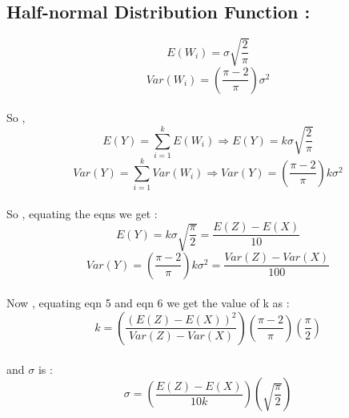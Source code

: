 \documentclass{article}
\begin{document}
    \subsection{Half-normal Distribution Function :}
    \vspace{5pt}
    \setcounter{equation}{0}
    \begin{equation}
        E(W_i) = \sigma \sqrt{\frac{2}{\pi}} 
    \end{equation}
    \begin{equation}
        Var(W_i) = \left(\frac{\pi-2}{\pi}\right)\sigma^2 
    \end{equation}
    \\So ,
    \begin{equation}
        E(Y) = \sum_{i = 1}^{k} E(W_i)
        \Rightarrow E(Y) = k\sigma \sqrt{\frac{2}{\pi}} 
    \end{equation}
    \begin{equation}
        Var(Y) = \sum_{i = 1}^{k} Var(W_i)
        \Rightarrow Var(Y) = \left(\frac{\pi-2}{\pi}\right)k\sigma^2
    \end{equation}
    \vspace{5pt}
    \\So , equating the eqns we get : 
    \begin{equation}
        E(Y) = k\sigma\sqrt{\frac{\pi}{2}} = \frac{E(Z) - E(X)}{10}
    \end{equation}
    \begin{equation}
        Var(Y) = \left(\frac{\pi-2}{\pi}\right)k\sigma^2 = \frac{Var(Z) - Var(X)}{100}
    \end{equation}
    \vspace{5pt}
    \\Now , equating eqn 5 and eqn 6 we get the value of k as : 
    \begin{equation}
        k = \left(\frac{(E(Z) - E(X))^2}{Var(Z) - Var(X)}\right)\left(\frac{\pi-2}{\pi}\right)\left(\frac{\pi}{2}\right)
    \end{equation}
    \vspace{5pt}
    \\ and $\sigma$ is :
    \begin{equation}
        \sigma = \left(\frac{E(Z) - E(X)}{10k}\right)\left(\sqrt{\frac{\pi}{2}}\right)
    \end{equation}
\end{document}

